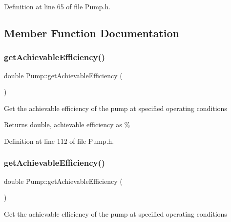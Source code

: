 Definition at line 65 of file Pump.\+h.



\subsection{Member Function Documentation}
\mbox{\label{class_pump_acf100af543142ab8404fc0ce2df1d157}} 
\subsubsection{\texorpdfstring{get\+Achievable\+Efficiency()}{getAchievableEfficiency()}\hspace{0.1cm}{\footnotesize\ttfamily [1/3]}}
{\footnotesize\ttfamily double Pump\+::get\+Achievable\+Efficiency (\begin{DoxyParamCaption}{ }\end{DoxyParamCaption})\hspace{0.3cm}{\ttfamily [inline]}}

Get the achievable efficiency of the pump at specified operating conditions

\begin{DoxyReturn}{Returns}
double, achievable efficiency as \% 
\end{DoxyReturn}


Definition at line 112 of file Pump.\+h.

\mbox{\label{class_pump_acf100af543142ab8404fc0ce2df1d157}} 
\subsubsection{\texorpdfstring{get\+Achievable\+Efficiency()}{getAchievableEfficiency()}\hspace{0.1cm}{\footnotesize\ttfamily [2/3]}}
{\footnotesize\ttfamily double Pump\+::get\+Achievable\+Efficiency (\begin{DoxyParamCaption}{ }\end{DoxyParamCaption})\hspace{0.3cm}{\ttfamily [inline]}}

Get the achievable efficiency of the pump at specified operating conditions

